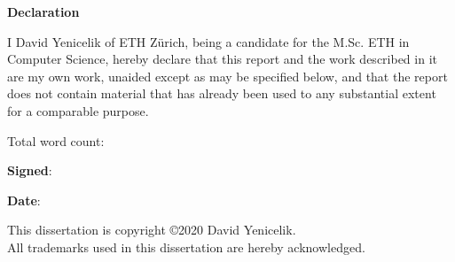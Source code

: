 \newpage
{\Huge \bf Declaration}

\vspace{24pt} 

I David Yenicelik of ETH Zürich, being a candidate for the M.Sc. ETH in
Computer Science, hereby declare that this report and the
work described in it are my own work, unaided except as may be
specified below, and that the report does not contain material that
has already been used to any substantial extent for a comparable
purpose.

\vspace{24pt}
Total word count: \wordcount

\vspace{60pt}
\textbf{Signed}: 

\vspace{12pt}
\textbf{Date}:


\vfill

This dissertation is copyright \copyright 2020 David Yenicelik. 
\\
All trademarks used in this dissertation are hereby acknowledged.



\newpage
\vspace*{\fill}
